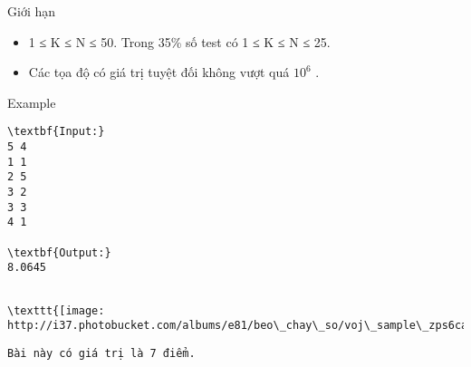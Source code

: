 Giới hạn
\begin{itemize}
	\item 1 ≤ K ≤ N ≤ 50. Trong 35\% số test có 1 ≤ K ≤ N ≤ 25.
	\item Các tọa độ có giá trị tuyệt đối không vượt quá $10^{6}$ .
\end{itemize}
Example
\begin{verbatim}
\textbf{Input:}
5 4
1 1
2 5
3 2
3 3
4 1

\textbf{Output:}
8.0645
\end{verbatim}
\begin{verbatim}

\texttt{[image: http://i37.photobucket.com/albums/e81/beo\_chay\_so/voj\_sample\_zps6cadef14.png]}\end{verbatim}
\begin{verbatim}
Bài này có giá trị là 7 điểm.\end{verbatim}
